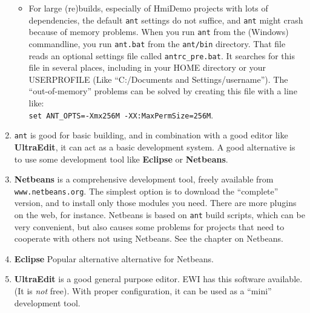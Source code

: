 \begin{enumerate}
\begin{itemize}
    \item For large (re)builds, especially of HmiDemo projects with lots of dependencies, the default \verb#ant# settings do not suffice, and \verb#ant# might crash because of memory problems.
        When you run \verb#ant# from the (Windows) commandline, you run \verb#ant.bat# from the \verb#ant/bin# directory. That file reads an optional settings file called \verb#antrc_pre.bat#.
        It searches for this file in several places, including in your HOME directory or your USERPROFILE
        (Like ``C:/Documents and Settings/username'').
        The ``out-of-memory'' problems can be solved by creating this file with a line like:\\
        \verb#set ANT_OPTS=-Xmx256M -XX:MaxPermSize=256M#.
    \end{itemize}
 \item \verb"ant" is good for basic building, and in combination with a good editor like  \textbf{UltraEdit},
 it can act as a basic development system.
 A good alternative is to use some development tool like \textbf{Eclipse} or \textbf{Netbeans}.
 \item \textbf{Netbeans} is a comprehensive development tool, freely available from
 \verb#www.netbeans.org#. The simplest option is to download the ``complete'' version, and to install
 only those modules you need. There are more plugins on the web, for instance.
 Netbeans is based on \verb#ant# build scripts, which can be very convenient, but
 also causes some problems for projects that need to cooperate with others not using Netbeans.
 See the chapter on Netbeans.
 \item \textbf{Eclipse} Popular alternative alternative for Netbeans.
 \item \textbf{UltraEdit} is a good general purpose editor. EWI has this software available.
 (It is \emph{not} free). With proper configuration, it can be used as a ``mini'' development tool.
 \end{enumerate}





